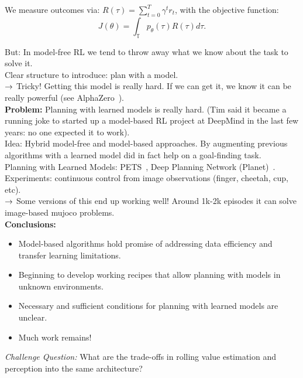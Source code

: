 We measure outcomes via: $R(\tau) = \sum_{t=0}^T \gamma^t r_t$, with the objective function:
\begin{equation}
    J(\theta) = \int_\mathbb{T} p_\theta(\tau) R(\tau) d\tau.
\end{equation}

But: In model-free RL we tend to throw away what we know about the task to solve it. \\

Clear structure to introduce: plan with a model. \\

$\rightarrow$ Tricky! Getting this model is really hard. If we can get it, we know it can be really powerful (see AlphaZero~\cite{silver2018general}). \\

{\bf Problem:} Planning with learned models is really hard. (Tim said it became a running joke to started up a model-based RL project at DeepMind in the last few years: no one expected it to work). \\

Idea: Hybrid model-free and model-based approaches. By augmenting previous algorithms with a learned model did in fact help on a goal-finding task. \\

Planning with Learned Models: PETS~\cite{chua2018deep}, Deep Planning Network (Planet)~\cite{hafner2018learning}. \\

Experiments: continuous control from image observations (finger, cheetah, cup, etc). \\

$\rightarrow$ Some versions of this end up working well! Around 1k-2k episodes it can solve image-based mujoco problems. \\

{\bf Conclusions:}
\begin{itemize}
    \item Model-based algorithms hold promise of addressing data efficiency and transfer learning limitations.
    \item Beginning to develop working recipes that allow planning with models in unknown environments.
    \item Necessary and sufficient conditions for planning with learned models are unclear.
    \item Much work remains!
\end{itemize}


{\it Challenge Question:} What are the trade-offs in rolling value estimation and perception into the same architecture? \\

